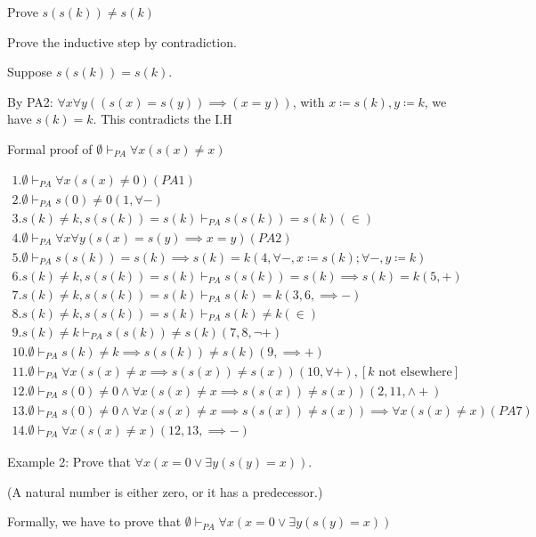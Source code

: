 \documentclass{article}
\begin{document}
Prove $s(s(k)) \ne s(k)$

Prove the inductive step by contradiction.

Suppose $s(s(k)) = s(k)$.

By PA2: $\forall x \forall y ((s(x) = s(y)) \implies (x = y))$, with $x \coloneqq s(k), y \coloneqq k$, we have $s(k) = k$. This contradicts the I.H

Formal proof of $\emptyset \vdash_{PA} \forall x (s(x) \ne x)$

\begin{align*}
1. \emptyset \vdash_{PA} \forall x (s(x) \ne 0) (PA1) \\
2. \emptyset \vdash_{PA} s(0) \ne 0 (1, \forall -) \\
3. s(k) \ne k, s(s(k)) = s(k) \vdash_{PA} s(s(k)) = s(k) (\in) \\
4. \emptyset \vdash_{PA} \forall x \forall y (s(x) = s(y) \implies x = y) (PA2) \\
5. \emptyset \vdash_{PA} s(s(k)) = s(k) \implies s(k) = k (4, \forall -, x \coloneqq s(k); \forall -, y \coloneqq k) \\
6. s(k) \ne k, s(s(k)) = s(k) \vdash_{PA} s(s(k)) = s(k) \implies s(k) = k (5, +) \\
7. s(k) \ne k, s(s(k)) = s(k) \vdash_{PA} s(k) = k (3,6, \implies -) \\
8. s(k) \ne k, s(s(k)) = s(k) \vdash_{PA} s(k) \ne k (\in) \\
9. s(k) \ne k \vdash_{PA} s(s(k)) \ne s(k) (7,8, \neg +) \\
10. \emptyset \vdash_{PA} s(k) \ne k \implies s(s(k)) \ne s(k) (9, \implies +) \\
11. \emptyset \vdash_{PA} \forall x (s(x) \ne x \implies s(s(x)) \ne s(x)) (10, \forall +), [k \text{ not elsewhere}] \\
12. \emptyset \vdash_{PA} s(0) \ne 0 \wedge \forall x (s(x) \ne x \implies s(s(x)) \ne s(x)) (2, 11, \wedge +) \\
13. \emptyset \vdash_{PA} s(0) \ne 0 \wedge \forall x (s(x) \ne x \implies s(s(x)) \ne s(x)) \implies \forall x (s(x) \ne x) (PA7) \\
14. \emptyset \vdash_{PA} \forall x (s(x) \ne x) (12, 13, \implies -)
\end{align*}

Example 2: Prove that $\forall x (x = 0 \vee \exists y (s(y) = x))$. 

(A natural number is either zero, or it has a predecessor.)

Formally, we have to prove that $\emptyset \vdash_{PA} \forall x (x = 0 \vee \exists y (s(y) = x))$
\end{document}
